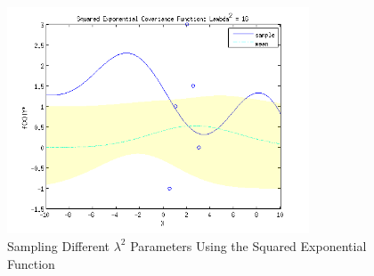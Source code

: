\documentclass{article}
\begin{document}
\begin{enumerate}[label=(\alph*)]
\begin{figure}[H]
\centering
\includegraphics[width=0.8\textwidth]{1_f_3.png}
\caption{Sampling Different $\lambda^2$ Parameters Using the Squared Exponential Function}
\label{fig:1f3}
\end{figure}

\end{enumerate}
\end{document}
